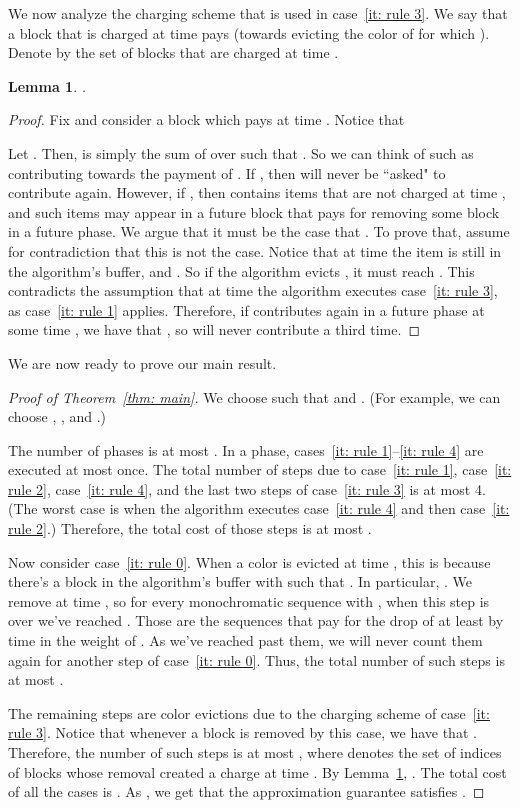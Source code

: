 \documentclass[11pt]{article}
\newtheorem{lemma}[theorem]{Lemma}
\newenvironment{proofof}[1]{\begin{proof}[Proof of #1]}{\end{proof}}
\begin{document}
We now analyze the charging scheme that is used in
case~\ref{it: rule 3}. We say that a block 
that is charged at time  pays  (towards
evicting the color of  for which ).
Denote by  the set of blocks that are charged
at time .
\begin{lemma}\label{lm: charge}
.
\end{lemma}

\begin{proof}
Fix  and consider a block  which pays
 at time . Notice that

Let . Then,  is simply the
sum of  over  such that
. So we can think of such 
as contributing  towards the payment of .
If , then  will never be ``asked" to contribute again.
However, if , then  contains items that are not charged
at time , and such items may appear in a future block  that
pays for removing some block in a future phase. We argue that
it must be the case that . To prove that, assume for
contradiction that this is not the case. Notice that at time  the item
 is still in the algorithm's buffer, and . So
if the algorithm evicts , it must reach . This contradicts
the assumption that at time  the algorithm executes case~\ref{it: rule 3},
as case~\ref{it: rule 1} applies. Therefore, if  contributes again
in a future phase at some time , we have that ,
so  will never contribute a third time.
\end{proof}

We are now ready to prove our main result.
\begin{proofof}{Theorem~\ref{thm: main}}
We choose 
such that  and
.
(For example, we can choose ,
, and .)

The number of phases is at most .
In a phase, cases~\ref{it: rule 1}--\ref{it: rule 4} are executed
at most once. The total number of steps due to case~\ref{it: rule 1},
case~\ref{it: rule 2}, case~\ref{it: rule 4}, and the last two steps of
case~\ref{it: rule 3} is at most 4. (The worst case is when the
algorithm executes case~\ref{it: rule 4} and then case~\ref{it: rule 2}.)
Therefore, the total cost of those steps is at most
.

Now consider case~\ref{it: rule 0}. When a color  is evicted
at time , this is because there's a block  in the algorithm's
buffer with  such that . In particular,
. We remove  at time , so
for every monochromatic sequence  with ,
when this step is over we've reached . Those are the sequences
that pay for the drop of at least  by time  in the weight
of . As we've reached past them, we will never count them
again for another step of case~\ref{it: rule 0}. Thus, the total number
of such steps is at most .

The remaining steps are color evictions due to the charging
scheme of case~\ref{it: rule 3}. Notice that whenever a block
 is removed by this case, we have that
.
Therefore, the number of such steps is at most
,
where  denotes the set of indices of blocks whose removal
created a charge at time . By Lemma~\ref{lm: charge},
.
The total cost of all the cases is
.
As , we get that the approximation guarantee 
satisfies
.
\end{proofof}
\end{document}
